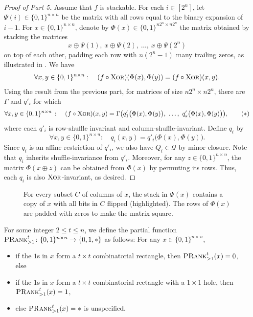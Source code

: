 \documentclass{article}
\begin{document}
\begin{proof}[Proof of Part 5]
    Assume that $f$ is stackable. For each $i\in [2^n]$, let $\Psi(i)\in \{0,1\}^{n\times n}$ be the matrix with all rows equal to the binary expansion of $i-1$.
    For $x\in\{0,1\}^{n\times n}$, denote by $\Phi(x)\in \{0,1\}^{n2^n \times n2^n}$ the matrix obtained by stacking the matrices
    \[
        x\oplus \Psi(1),\ x\oplus \Psi(2),\ \dots,\ x \oplus \Psi(2^n)
    \]
    on top of each other, padding each row with $n(2^n-1)$ many trailing zeros, as illustrated in . We have
    \[
        \forall x,y\in\{0,1\}^{n\times n}:\quad 
        (f\circ \operatorname{\textsc{Xor}})(\Phi(x),\Phi(y)) = (f\circ \operatorname{\textsc{Xor}})(x,y).
    \]
    Using the result from the previous part, for matrices of size $n2^n \times n2^n$, there are $\Gamma$ and $q'_i$ for which
    \[
        \forall x,y\in \{0,1\}^{n\times n}\ \colon\quad
        (f\circ \xor)(x,y) = \Gamma\big(q'_1\big(\Phi(x),\Phi(y)\big),\ \dots,\ q'_s\big(\Phi(x),\Phi(y)\big)\big),\tag{$\ast$}\label{eq:Gamma}
    \]
    where each $q'_i$ is row-shuffle invariant and column-shuffle-invariant. Define $q_i$ by
    \[
        \forall x,y\in \{0,1\}^{n\times n}:\quad
        q_i(x,y) = q'_i\big(\Phi(x), \Phi(y)\big).
    \]
    Since $q_i$ is an affine restriction of $q'_i$, we also have $Q_i\in \mathcal{Q}$ by minor-closure. Note that $q_i$ inherits shuffle-invariance from $q'_i$. Moreover, for any $z\in \{0,1\}^{n\times n}$, the matrix $\Phi(x\oplus z)$ can be obtained from $\Phi(x)$ by permuting its rows. Thus, each $q_i$ is also $\operatorname{\textsc{Xor}}$-invariant, as desired.
\end{proof}

\begin{figure}
    \centering
    
    \caption{For every subset $C$ of columns of $x$, the stack in $\Phi(x)$ contains a copy of $x$ with all bits in $C$ flipped (highlighted). The rows of $\Phi(x)$ are padded with zeros to make the matrix square.}
    \label{fig:stack}
\end{figure}

\begin{boxdefinition}
    For some integer $2\leq t\leq n$, we define the partial function $\operatorname{\textsc{PRank}}^t_{>1}\colon\{0,1\}^{n\times n}\to\{0,1,\ast\}$ as follows: For any $x\in \{0,1\}^{n\times n}$,
    \begin{itemize}
        \item if the $1$s in $x$ form a $t \times t$ combinatorial rectangle, then $\operatorname{\textsc{PRank}}^t_{>1}(x) = 0$, else
        \item if the $1$s in $x$ form a $t \times t$ combinatorial rectangle with a $1\times 1$ hole, then $\operatorname{\textsc{PRank}}^t_{>1}(x) = 1$,
        \item else $\operatorname{\textsc{PRank}}^t_{>1}(x) = \ast$ is unspecified.
    \end{itemize}
\end{boxdefinition}
\end{document}
